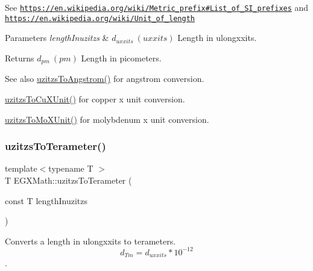See \href{https://en.wikipedia.org/wiki/Metric_prefix#List_of_SI_prefixes}{\tt https\+://en.\+wikipedia.\+org/wiki/\+Metric\+\_\+prefix\#\+List\+\_\+of\+\_\+\+S\+I\+\_\+prefixes} and \href{https://en.wikipedia.org/wiki/Unit_of_length}{\tt https\+://en.\+wikipedia.\+org/wiki/\+Unit\+\_\+of\+\_\+length} 
\begin{DoxyParams}{Parameters}
{\em length\+Inuzitzs} & $ d_{uxxits}\ (uxxits)$ Length in ulongxxits. \\
\hline
\end{DoxyParams}
\begin{DoxyReturn}{Returns}
$ d_{pm}\ (pm)$ Length in picometers. 
\end{DoxyReturn}
\begin{DoxySeeAlso}{See also}
\mbox{\hyperlink{group___e_g_x_math-_conversions-_length_conversions-uzitzs-_non-_s_i_gaaaecee65b1db5abcc71e18526e7073eb}{uzitzs\+To\+Angstrom()}} for angstrom conversion. 

\mbox{\hyperlink{group___e_g_x_math-_conversions-_length_conversions-uzitzs-_non-_s_i_gab25470e41b88c41d4bf32622baa6c472}{uzitzs\+To\+Cu\+X\+Unit()}} for copper x unit conversion. 

\mbox{\hyperlink{group___e_g_x_math-_conversions-_length_conversions-uzitzs-_non-_s_i_ga64b556911b0bb06cf315aa02f5e2d379}{uzitzs\+To\+Mo\+X\+Unit()}} for molybdenum x unit conversion. 
\end{DoxySeeAlso}
\mbox{\label{group___e_g_x_math-_conversions-_length_conversions-uzitzs-_s_i_gaed1a457a06ea3b69a4c63414b08b03a3}} 
\subsubsection{\texorpdfstring{uzitzs\+To\+Terameter()}{uzitzsToTerameter()}}
{\footnotesize\ttfamily template$<$typename T $>$ \\
T E\+G\+X\+Math\+::uzitzs\+To\+Terameter (\begin{DoxyParamCaption}\item[{const T}]{length\+Inuzitzs }\end{DoxyParamCaption})}



Converts a length in ulongxxits to terameters. \[ d_{Tm}=d_{uxxits} * 10^{-12} \]. 

